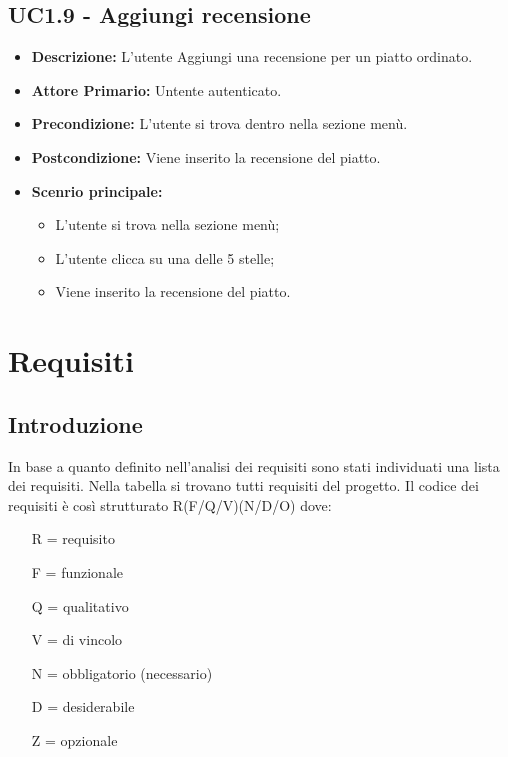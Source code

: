 \subsection{UC1.9 - Aggiungi recensione}
\begin{itemize}
    \item \textbf{Descrizione:} L'utente Aggiungi una recensione per un piatto ordinato.
    \item \textbf{Attore Primario:} Untente autenticato.
    \item \textbf{Precondizione:} L'utente si trova dentro nella sezione menù.
    \item \textbf{Postcondizione:} Viene inserito la recensione del piatto.
    \item \textbf{Scenrio principale:}
    \begin{itemize}
        \item L'utente si trova nella sezione menù;
        \item L'utente clicca su una delle 5 stelle;
        \item Viene inserito la recensione del piatto.
    \end{itemize}
\end{itemize}


\section{Requisiti}
\subsection{Introduzione}
In base a quanto definito nell'analisi dei requisiti sono stati individuati una lista dei requisiti. Nella tabella si trovano tutti requisiti del progetto.
Il codice dei requisiti è così strutturato R(F/Q/V)(N/D/O) dove:
\begin{enumerate}
	\item[R =] requisito
    \item[F =] funzionale
    \item[Q =] qualitativo
    \item[V =] di vincolo
    \item[N =] obbligatorio (necessario)
    \item[D =] desiderabile
    \item[Z =] opzionale
\end{enumerate}
